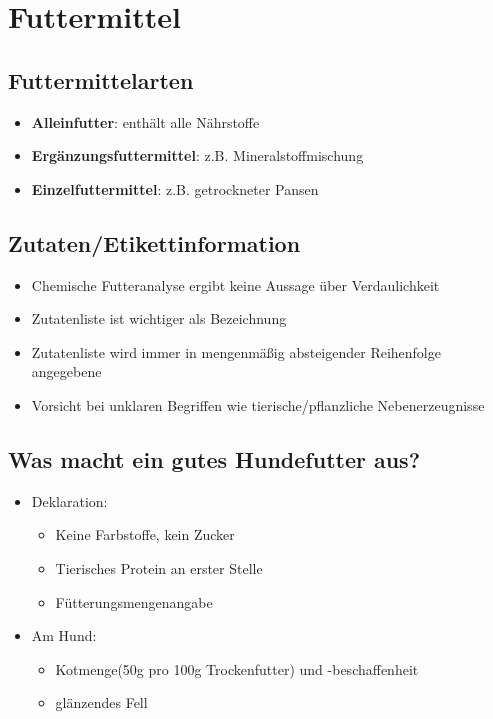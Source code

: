 \section{Futtermittel}

    \subsection{Futtermittelarten}
        \begin{itemize}
            \item \textbf{Alleinfutter}: enthält alle Nährstoffe
            \item \textbf{Ergänzungsfuttermittel}: z.B. Mineralstoffmischung
            \item \textbf{Einzelfuttermittel}: z.B. getrockneter Pansen
        \end{itemize}

    \subsection{Zutaten/Etikettinformation}
        \begin{itemize}
            \item Chemische Futteranalyse ergibt keine Aussage über Verdaulichkeit
            \item Zutatenliste ist wichtiger als Bezeichnung
            \item Zutatenliste wird immer in mengenmäßig absteigender Reihenfolge angegebene
            \item Vorsicht bei unklaren Begriffen wie tierische/pflanzliche Nebenerzeugnisse
        \end{itemize}

    \subsection{Was macht ein gutes Hundefutter aus?}
        \begin{itemize}
            \item Deklaration:
            \begin{itemize}
                \item Keine Farbstoffe, kein Zucker
                \item Tierisches Protein an erster Stelle
                \item Fütterungsmengenangabe
            \end{itemize}
            \item Am Hund:
            \begin{itemize}
                \item Kotmenge(50g pro 100g Trockenfutter) und -beschaffenheit
                \item glänzendes Fell
            \end{itemize}
        \end{itemize}


